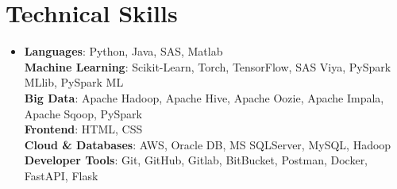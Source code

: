 \section{Technical Skills}
\begin{itemize}[leftmargin=0.15in, label={}]
	\item{
		\textbf{Languages}{: Python, Java, SAS, Matlab} \\
		\textbf{Machine Learning}{: Scikit-Learn, Torch, TensorFlow, SAS Viya, PySpark MLlib, PySpark ML} \\
		\textbf{Big Data}{: Apache Hadoop, Apache Hive, Apache Oozie, Apache Impala, Apache Sqoop, PySpark} \\
		\textbf{Frontend}{: HTML, CSS} \\
		\textbf{Cloud \& Databases}{: AWS, Oracle DB, MS SQLServer, MySQL, Hadoop} \\
		\textbf{Developer Tools}{: Git, GitHub, Gitlab, BitBucket, Postman, Docker, FastAPI, Flask} \\
		
	}
\end{itemize}
\vspace{-15pt}